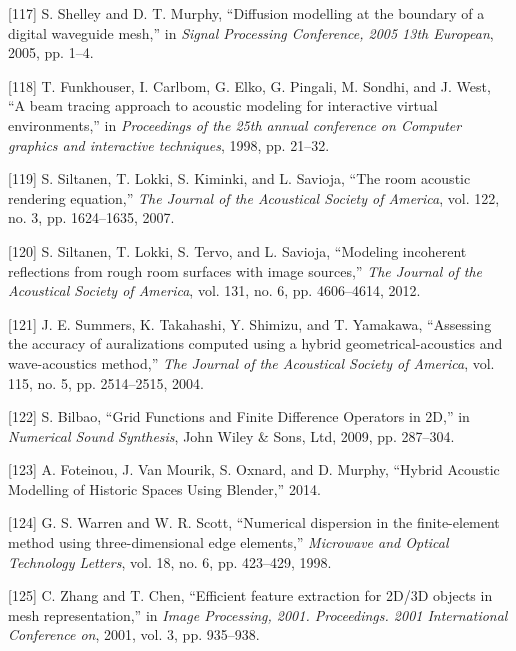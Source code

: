 \documentclass[]{scrreprt}
\begin{document}
\hypertarget{ref-shelleyux5fdiffusionux5f2005}{}
{[}117{]} S. Shelley and D. T. Murphy, ``Diffusion modelling at the
boundary of a digital waveguide mesh,'' in \emph{Signal Processing
Conference, 2005 13th European}, 2005, pp. 1--4.

\hypertarget{ref-funkhouserux5fbeamux5f1998}{}
{[}118{]} T. Funkhouser, I. Carlbom, G. Elko, G. Pingali, M. Sondhi, and
J. West, ``A beam tracing approach to acoustic modeling for interactive
virtual environments,'' in \emph{Proceedings of the 25th annual
conference on Computer graphics and interactive techniques}, 1998, pp.
21--32.

\hypertarget{ref-siltanenux5froomux5f2007}{}
{[}119{]} S. Siltanen, T. Lokki, S. Kiminki, and L. Savioja, ``The room
acoustic rendering equation,'' \emph{The Journal of the Acoustical
Society of America}, vol. 122, no. 3, pp. 1624--1635, 2007.

\hypertarget{ref-siltanenux5fmodelingux5f2012}{}
{[}120{]} S. Siltanen, T. Lokki, S. Tervo, and L. Savioja, ``Modeling
incoherent reflections from rough room surfaces with image sources,''
\emph{The Journal of the Acoustical Society of America}, vol. 131, no.
6, pp. 4606--4614, 2012.

\hypertarget{ref-summersux5fassessingux5f2004}{}
{[}121{]} J. E. Summers, K. Takahashi, Y. Shimizu, and T. Yamakawa,
``Assessing the accuracy of auralizations computed using a hybrid
geometrical-acoustics and wave-acoustics method,'' \emph{The Journal of
the Acoustical Society of America}, vol. 115, no. 5, pp. 2514--2515,
2004.

\hypertarget{ref-bilbaoux5fgridux5f2009}{}
{[}122{]} S. Bilbao, ``Grid Functions and Finite Difference Operators in
2D,'' in \emph{Numerical Sound Synthesis}, John Wiley \& Sons, Ltd,
2009, pp. 287--304.

\hypertarget{ref-foteinouux5fhybridux5f2014}{}
{[}123{]} A. Foteinou, J. Van Mourik, S. Oxnard, and D. Murphy, ``Hybrid
Acoustic Modelling of Historic Spaces Using Blender,'' 2014.

\hypertarget{ref-warrenux5fnumericalux5f1998}{}
{[}124{]} G. S. Warren and W. R. Scott, ``Numerical dispersion in the
finite-element method using three-dimensional edge elements,''
\emph{Microwave and Optical Technology Letters}, vol. 18, no. 6, pp.
423--429, 1998.

\hypertarget{ref-zhangux5fefficientux5f2001}{}
{[}125{]} C. Zhang and T. Chen, ``Efficient feature extraction for 2D/3D
objects in mesh representation,'' in \emph{Image Processing, 2001.
Proceedings. 2001 International Conference on}, 2001, vol. 3, pp.
935--938.
\end{document}
